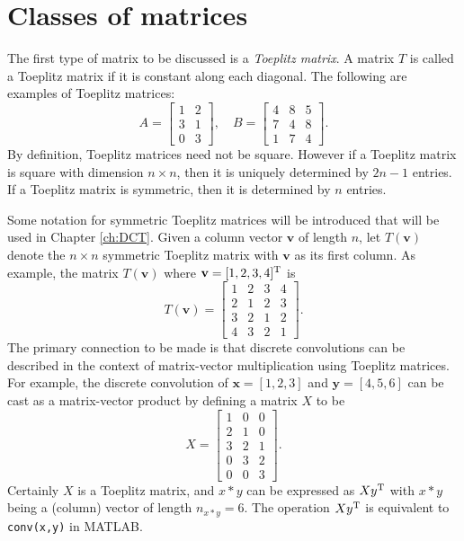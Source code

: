 \section{Classes of matrices} \label{sec:Classes of matrices}
The first type of matrix to be discussed is a \textit{Toeplitz matrix}. A matrix $T$ is called a Toeplitz matrix if it is constant along each diagonal. The following are examples of Toeplitz matrices:
\[A = \begin{bmatrix}
1 & 2 \\
3 & 1 \\
0 & 3
\end{bmatrix}, \quad 
B = \begin{bmatrix}
4 & 8 & 5 \\
7 & 4 & 8 \\
1 & 7 & 4
\end{bmatrix}.\]
By definition, Toeplitz matrices need not be square. However if a Toeplitz matrix is square with dimension $n \times n$, then it is uniquely determined by $2n-1$ entries. If a Toeplitz matrix is symmetric, then it is determined by $n$ entries. \par
Some notation for symmetric Toeplitz matrices will be introduced that will be used in Chapter \ref{ch:DCT}. Given a column vector $\mathbf{v}$ of length $n$, let $T(\mathbf{v})$ denote the $n \times n$ symmetric Toeplitz matrix with $\mathbf{v}$ as its first column. As example, the matrix $T(\mathbf{v})$ where $\mathbf{v} = [1,2,3,4]^{\mathrm{T}}$ is
\[T(\mathbf{v}) = \begin{bmatrix}
1 & 2 & 3 & 4 \\
2 & 1 & 2 & 3 \\
3 & 2 & 1 & 2 \\
4 & 3 & 2 & 1 
\end{bmatrix}.\] 
The primary connection to be made is that discrete convolutions can be described in the context of matrix-vector multiplication using Toeplitz matrices. For example, the discrete convolution of $\mathbf{x} = [1,2,3]$ and $\mathbf{y} = [4,5,6]$ can be cast as a matrix-vector product by defining a matrix $X$ to be
\[X = \begin{bmatrix}
1 & 0 & 0  \\
2 & 1 & 0 \\
3 & 2 & 1 \\
0 & 3 & 2 \\
0 & 0 & 3 
\end{bmatrix}.\]
Certainly $X$ is a Toeplitz matrix, and $x*y$ can be expressed as $Xy^{\mathrm{T}}$ with $x*y$ being a (column) vector of length $n_{x*y} = 6$. The operation $Xy^{\mathrm{T}}$ is equivalent to \texttt{conv(x,y)} in MATLAB. \par 
